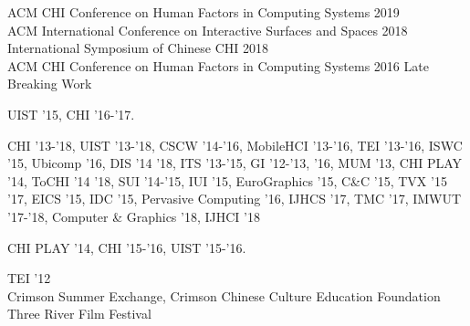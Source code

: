  {
	 {
		ACM CHI Conference on Human Factors in Computing Systems 2019\\
		ACM International Conference on Interactive Surfaces and Spaces 2018\\
		International Symposium of Chinese CHI 2018\\
		ACM CHI Conference on Human Factors in Computing Systems 2016 Late Breaking Work
	}
}

 {
	 {
		UIST '15, CHI '16-'17.
	}
}

 {
	 {
		CHI '13-’18, UIST '13-’18, CSCW '14-’16, MobileHCI '13-’16, TEI ’13-’16, ISWC ’15, Ubicomp ’16, DIS '14 '18, ITS '13-’15, GI '12-’13, '16, MUM '13, CHI PLAY '14, ToCHI '14 '18, SUI '14-’15, IUI '15, EuroGraphics '15, C\&C '15, TVX '15 '17, EICS '15, IDC '15, Pervasive Computing '16, IJHCS '17, TMC '17, IMWUT '17-'18, Computer \& Graphics '18, IJHCI '18
	}
}

 {
	 {
		CHI PLAY '14, CHI ’15-'16, UIST ’15-'16.
	}
}

 {
	 {
		TEI '12\\
		Crimson Summer Exchange, Crimson Chinese Culture Education Foundation\\
		Three River Film Festival
	}
}